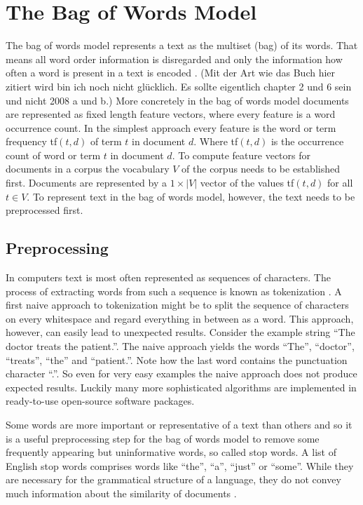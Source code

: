 \section{The Bag of Words Model}
The bag of words model represents a text as the multiset (bag) of its words. That means all word
order information is disregarded and only the information how often a word is present in a text is encoded \citep{Manning2008vect}. (Mit der Art wie das Buch hier zitiert wird bin ich noch nicht glücklich. Es sollte eigentlich chapter 2 und 6 sein und nicht 2008 a und b.)
More concretely in the bag of words model documents are represented as fixed length
feature vectors, where every feature is a word occurrence
count. In the simplest approach every feature is the word or term frequency
tf$(t,d)$ of term $t$ in document $d$. Where tf$(t,d)$ is
the occurrence count of word or term $t$ in document $d$. To compute feature
vectors for documents in a corpus the vocabulary $V$ of the corpus
needs to be established first. Documents are represented by a $1\times|V|$
vector of the values tf$(t,d)$ for all $t\in V$.
To represent text in the bag of words model, however, the text needs to be preprocessed first.

\subsection*{Preprocessing}
In computers text is most often represented as sequences of characters. The process of extracting words from such a sequence is known as tokenization \citep{Manning2008prepr}. A first naive approach to tokenization might be to
split the sequence of characters on every whitespace and regard everything
in between as a word. This approach, however, can easily lead to unexpected
results. Consider the example string ``The doctor treats the patient.''. The naive
approach yields the words ``The'', ``doctor'', ``treats'', ``the'' and ``patient.''.
Note how the last word contains the punctuation character ``.''.
So even for very easy examples the naive approach does not produce
expected results. Luckily many more sophisticated algorithms are implemented
in ready-to-use open-source software packages.

Some words are more important or representative of a text than others and so it is a useful preprocessing step for the bag of words model to remove some frequently appearing but uninformative words, so called stop words. A list of English stop words comprises words like ``the'', ``a'', ``just'' or ``some''.  While they are necessary for the
grammatical structure of a language, they do not convey much information
about the similarity of documents \citep{Manning2008prepr}.

